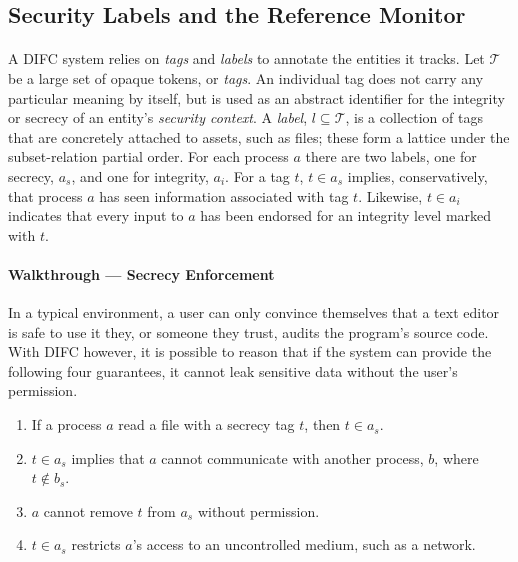 \subsection{Security Labels and the Reference Monitor}

\paragraph{} A DIFC system relies on \textit{tags} and \textit{labels} to annotate the entities it tracks. Let $\mathcal{T}$ be a large set of opaque tokens, or \textit{tags}. An individual tag does not carry any particular meaning by itself, but is used as an abstract identifier for the integrity or secrecy of an entity's \textit{security context}. A \textit{label}, $l \subseteq \mathcal{T}$, is a collection of tags that are concretely attached to assets, such as files; these form a lattice under the subset-relation partial order. For each process $a$ there are two labels, one for secrecy, $a_s$, and one for integrity, $a_i$. For a tag $t$, $t \in a_s$ implies, conservatively, that process $a$ has seen information associated with tag $t$. Likewise, $t \in a_i$ indicates that every input to $a$ has been endorsed for an integrity level marked with $t$.

\paragraph{Walkthrough --- Secrecy Enforcement} In a typical environment, a user can only convince themselves that a text editor is safe to use it they, or someone they trust, audits the program's source code. With DIFC however, it is possible to reason that if the system can provide the following four guarantees, it cannot leak sensitive data without the user's permission.

\begin{enumerate}
    \item If a process $a$ read a file with a secrecy tag $t$, then $t \in a_s$.
    \item $t \in a_s$ implies that $a$ cannot communicate with another process, $b$, where $t \notin b_s$.
    \item $a$ cannot remove $t$ from $a_s$ without permission.
    \item $t \in a_s$ restricts $a$'s access to an uncontrolled medium, such as a network.
\end{enumerate}


